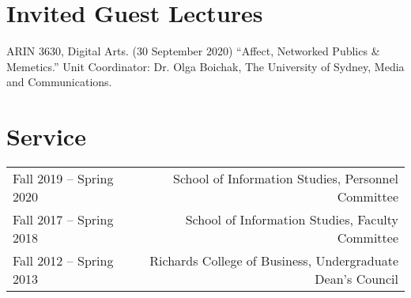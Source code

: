 \documentclass[12pt]{article}
\begin{document}
\section*{Invited Guest Lectures}
ARIN 3630, Digital Arts. (30 September 2020) 
“Affect, Networked Publics \& Memetics.” Unit Coordinator: Dr. Olga Boichak, The University of Sydney, Media and Communications.


\section*{Service}
\begin{adjustbox}{width=\textwidth}
\begin{tabular}{l r}
Fall 2019 -- Spring 2020 & School of Information Studies, Personnel Committee\\
Fall 2017 -- Spring 2018 & School of Information Studies, Faculty Committee\\
Fall 2012 -- Spring 2013 & Richards College of Business, Undergraduate Dean's Council\\

\end{tabular}
\end{adjustbox}
\end{document}
